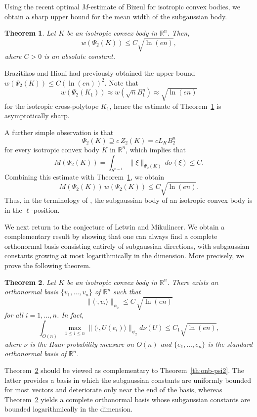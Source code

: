 \documentclass[10pt,a4paper]{amsart}
\newtheorem{theorem}{Theorem}[section]
\numberwithin{equation}{section}
\newcommand{\ls}{\leqslant}
\begin{document}
Using the recent optimal $M$-estimate of Bizeul \cite{Bizeul-M-2026} for isotropic convex bodies,
we obtain a sharp upper bound for the mean width of the subgaussian body.


\begin{theorem}\label{th:mean-width}Let $K$ be an isotropic convex body in ${\mathbb{R}}^n$. Then,
\[w(\Psi_2(K))\ls C\sqrt{\ln(en)},\]
where $C>0$ is an absolute constant.
\end{theorem}

Brazitikos and Hioni \cite{Brazitikos-Hioni-2015} had previously obtained the upper bound $w(\Psi_2(K))\ls C(\ln(en))^2$. Note that
$$w(\Psi_2(K_1))\approx w(\sqrt{n}B_1^n)\approx\sqrt{\ln(en)}$$
for the isotropic cross-polytope $K_1$, hence the estimate of Theorem~\ref{th:mean-width} is asymptotically sharp. 

A further simple observation is that \[\Psi_2(K)\supseteq c\,Z_2(K)=cL_KB_2^n\]
for every isotropic convex body $K$ in $\mathbb{R}^n$, which implies that
\[M(\Psi_2(K))=\int_{S^{n-1}}\|\xi\|_{\Psi_2(K)}\,d\sigma(\xi)\ls C.\]
Combining this estimate with Theorem~\ref{th:mean-width}, we obtain
\[M(\Psi_2(K))\,w(\Psi_2(K))\ls C\sqrt{\ln(en)}.\]
Thus, in the terminology of \cite[Chapter~6]{AGA-book}, the subgaussian body of an isotropic convex body is in the $\ell$-position.


\smallskip 

We next return to the conjecture of Letwin and Mikulincer. We obtain a complementary result by showing that one can always find a complete orthonormal
basis consisting entirely of subgaussian directions, with subgaussian constants growing at most logarithmically in the dimension. More
precisely, we prove the following theorem.

\begin{theorem}\label{th:partial-onb}Let $K$ be an isotropic convex body in ${\mathbb{R}}^n$. There exists
an orthonormal basis $\{v_1,\ldots ,v_n\}$ of $\mathbb{R}^n$ such that
\begin{equation*}\|\langle \cdot ,v_i\rangle\|_{\psi_2}\ls C\,\sqrt{\ln(en)}\end{equation*}
for all $i=1,\ldots ,n$. In fact,
$$\int_{O(n)}\max_{1\ls i\ls n} \|\langle \cdot,U(e_i)\rangle \|_{\psi_2}d\nu(U)  \ls C_1\sqrt{\ln (en)},$$
where $\nu$ is the Haar probability measure on $O(n)$ and $\{e_1,\ldots ,e_n\}$ is the standard orthonormal basis of $\mathbb{R}^n$.
\end{theorem}

Theorem~\ref{th:partial-onb} should be viewed as complementary to Theorem~\ref{th:onb-psi2}. The latter provides a basis in which the
subgaussian constants are uniformly bounded for most vectors and deteriorate only near the end of the basis, whereas
Theorem~\ref{th:partial-onb} yields a complete orthonormal basis whose subgaussian constants are bounded logarithmically in the dimension.
\end{document}
